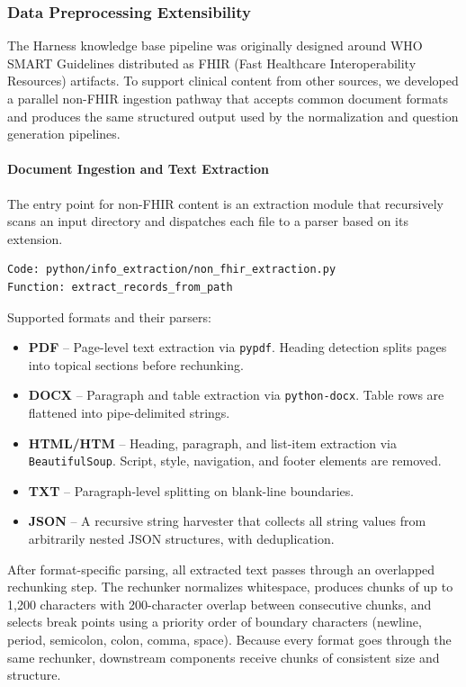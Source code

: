 
\subsubsection{Data Preprocessing Extensibility}
\label{subsubsec:preprocessing_extensibility}
The Harness knowledge base pipeline was originally designed around WHO SMART Guidelines distributed as FHIR (Fast Healthcare Interoperability Resources) artifacts. To support clinical content from other sources, we developed a parallel non-FHIR ingestion pathway that accepts common document formats and produces the same structured output used by the normalization and question generation pipelines.

\paragraph{Document Ingestion and Text Extraction}
The entry point for non-FHIR content is an extraction module that recursively scans an input directory and dispatches each file to a parser based on its extension.

\begin{verbatim}
Code: python/info_extraction/non_fhir_extraction.py
Function: extract_records_from_path
\end{verbatim}

Supported formats and their parsers:
\begin{itemize}
\item \textbf{PDF} -- Page-level text extraction via \texttt{pypdf}. Heading detection splits pages into topical sections before rechunking.
\item \textbf{DOCX} -- Paragraph and table extraction via \texttt{python-docx}. Table rows are flattened into pipe-delimited strings.
\item \textbf{HTML/HTM} -- Heading, paragraph, and list-item extraction via \texttt{BeautifulSoup}. Script, style, navigation, and footer elements are removed.
\item \textbf{TXT} -- Paragraph-level splitting on blank-line boundaries.
\item \textbf{JSON} -- A recursive string harvester that collects all string values from arbitrarily nested JSON structures, with deduplication.
\end{itemize}

After format-specific parsing, all extracted text passes through an overlapped rechunking step. The rechunker normalizes whitespace, produces chunks of up to 1,200 characters with 200-character overlap between consecutive chunks, and selects break points using a priority order of boundary characters (newline, period, semicolon, colon, comma, space). Because every format goes through the same rechunker, downstream components receive chunks of consistent size and structure.

